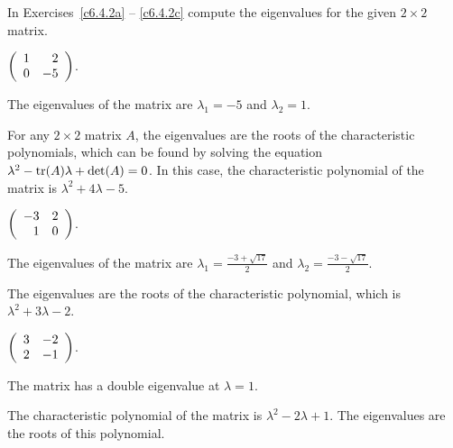 \documentclass{ximera}
\begin{document}
\noindent In Exercises~\ref{c6.4.2a} -- \ref{c6.4.2c} compute the
eigenvalues for the given $2\times 2$ matrix.
\begin{exercise} \label{c6.4.2a}
$\left(\begin{array}{rr} 1 & 2\\ 0 &-5\end{array}\right)$.

\begin{solution}
\ans The eigenvalues of the matrix are $\lambda_1 = -5$ and
$\lambda_2 = 1$.

\soln For any $2 \times 2$ matrix $A$, the eigenvalues are the roots
of the characteristic polynomials, which can be found by solving the
equation $\lambda^2 - {\rm tr}(A)\lambda + \det(A) = 0$.  In this case, the
characteristic polynomial of the matrix is $\lambda^2 + 4\lambda - 5$.

\end{solution}
\end{exercise}
\begin{exercise} \label{c6.4.2b}
$\left(\begin{array}{rr} -3 & 2\\ 1 &0\end{array}\right)$.

\begin{solution}
\ans The eigenvalues of the matrix are
$\lambda_1 = \frac{-3 + \sqrt{17}}{2}$ and $\lambda_2 =
\frac{-3 - \sqrt{17}}{2}$.

\soln The eigenvalues are the roots of the characteristic polynomial, which
is $\lambda^2 + 3\lambda - 2$.

\end{solution}
\end{exercise}
\begin{exercise} \label{c6.4.2c}
$\left(\begin{array}{rr} 3 & -2\\ 2 &-1\end{array}\right)$.

\begin{solution}
\ans The matrix has a double eigenvalue at $\lambda = 1$.

\soln The characteristic polynomial of the matrix is $\lambda^2 - 2\lambda
+ 1$.  The eigenvalues are the roots of this polynomial.

\end{solution}
\end{exercise}
\end{document}
